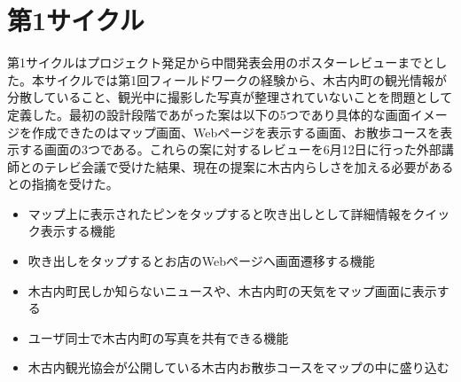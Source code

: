 \section{第1サイクル}
第1サイクルはプロジェクト発足から中間発表会用のポスターレビューまでとした。本サイクルでは第1回フィールドワークの経験から、木古内町の観光情報が分散していること、観光中に撮影した写真が整理されていないことを問題として定義した。最初の設計段階であがった案は以下の5つであり具体的な画面イメージを作成できたのはマップ画面、Webページを表示する画面、お散歩コースを表示する画面の3つである。これらの案に対するレビューを6月12日に行った外部講師とのテレビ会議で受けた結果、現在の提案に木古内らしさを加える必要があるとの指摘を受けた。
\begin{itemize}
 \item マップ上に表示されたピンをタップすると吹き出しとして詳細情報をクイック表示する機能
 \item 吹き出しをタップするとお店のWebページへ画面遷移する機能
 \item 木古内町民しか知らないニュースや、木古内町の天気をマップ画面に表示する
 \item ユーザ同士で木古内町の写真を共有できる機能
 \item 木古内観光協会が公開している木古内お散歩コースをマップの中に盛り込む
\end{itemize}

